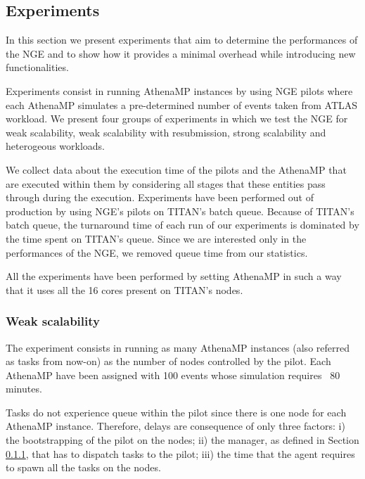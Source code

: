 
\subsection{Experiments}

In this section we present experiments that aim to determine the performances of the NGE and to show how it provides a minimal overhead while introducing new functionalities.

Experiments consist in running AthenaMP instances by using NGE pilots where each AthenaMP simulates a pre-determined number of events taken from ATLAS workload.	
We present four groups of experiments in which we test the NGE for weak scalability, weak scalability with resubmission, strong scalability and heterogeous workloads.

We collect data about the execution time of the pilots and the AthenaMP that are executed within them by considering all stages that these entities pass through during the execution.
Experiments have been performed out of production by using NGE's pilots on TITAN's batch queue. 
Because of TITAN's batch queue, the turnaround time of each run of our experiments is dominated by the time spent on TITAN's queue. Since we are interested only in the performances of the NGE, we removed queue time from our statistics.

All the experiments have been performed by setting AthenaMP in such a way that it uses all the 16 cores present on TITAN's nodes. 


\subsubsection{Weak scalability}

The experiment consists in running as many AthenaMP instances (also referred as tasks from now-on) as the number of nodes controlled by the pilot. Each AthenaMP have been assigned with 100 events whose simulation requires  ~$80$ minutes. 
 
Tasks do not experience queue within the pilot since there is one node for each AthenaMP instance. Therefore, delays are consequence of only three factors: i) the bootstrapping of the pilot on the nodes; ii) the manager, as defined in Section \ref{}, that has to dispatch tasks to the pilot; iii) the time that the agent requires to spawn all the tasks on the nodes.

